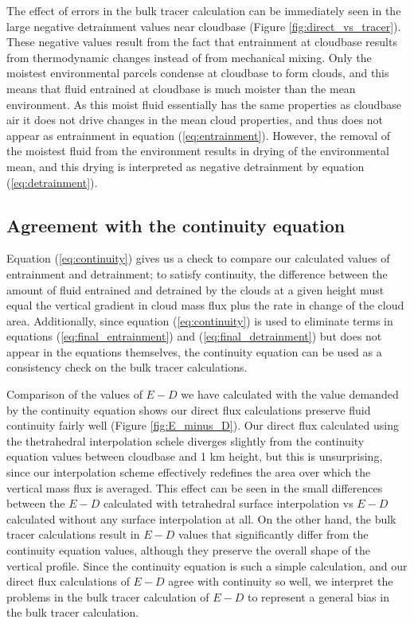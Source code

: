 \documentclass[12pt]{article}
\begin{document}
The effect of errors in the bulk tracer calculation can be immediately seen in
the large negative detrainment values near cloudbase (Figure 
\ref{fig:direct_vs_tracer}).  These negative values result from the fact that
entrainment at cloudbase results from thermodynamic changes instead of from
mechanical mixing.  Only the moistest environmental parcels condense at
cloudbase to form clouds, and this means that fluid entrained at cloudbase is
much moister than the mean environment.  As this moist fluid essentially has 
the same properties as cloudbase air it does not drive changes in the mean
cloud properties, and thus does not appear as entrainment in equation 
(\ref{eq:entrainment}).  However, the removal of the moistest fluid from the
environment results in drying of the environmental mean, and this drying is
interpreted as negative detrainment by equation (\ref{eq:detrainment}).


\subsection{Agreement with the continuity equation}

Equation (\ref{eq:continuity}) gives us a check to compare our calculated 
values of entrainment and detrainment; to satisfy continuity, the difference 
between the amount of fluid entrained and detrained by the clouds at a given 
height must equal the vertical gradient in cloud mass flux plus the rate in 
change of the cloud area.  Additionally, since equation (\ref{eq:continuity}) 
is used to eliminate terms in equations (\ref{eq:final_entrainment}) and 
(\ref{eq:final_detrainment}) but does not appear in the equations themselves, 
the continuity equation can be used as a consistency check on the bulk tracer 
calculations.

Comparison of the values of $E-D$ we have calculated with the value demanded by 
the continuity equation shows our direct flux calculations preserve fluid 
continuity fairly well (Figure \ref{fig:E_minus_D}).  Our direct flux 
calculated using the thetrahedral interpolation schele diverges slightly from
the continuity equation values between cloudbase and 1 km height, but this is
unsurprising, since our interpolation scheme effectively redefines the area
over which the vertical mass flux is averaged.  This effect can be seen in the 
small differences between the $E-D$ calculated with tetrahedral surface
interpolation vs $E-D$ calculated without any surface interpolation at all.  On
the other hand, the bulk tracer calculations result in $E-D$ values that
significantly differ from the continuity equation values, although they 
preserve the overall shape of the vertical profile.  Since the continuity 
equation is such a simple calculation, and our direct flux calculations of 
$E-D$ agree with continuity so well, we interpret the problems in the bulk 
tracer calculation of $E-D$ to represent a general bias in the bulk tracer 
calculation.
\end{document}
